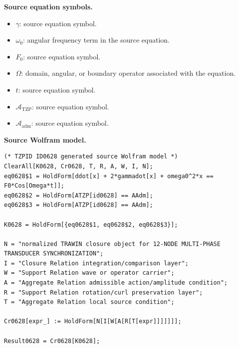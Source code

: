 \begin{minipage}[t]{0.49\linewidth}
\begingroup
\small
\raggedright
\textbf{Source equation symbols.}\par
\begin{itemize}[leftmargin=1.35em,itemsep=1pt,topsep=1pt,parsep=0pt]
    \item $\gamma$: source equation symbol.
    \item $\omega_0$: angular frequency term in the source equation.
    \item $F_0$: source equation symbol.
    \item $\Omega$: domain, angular, or boundary operator associated with the equation.
    \item $t$: source equation symbol.
    \item $\mathcal{A}_{\mathrm{TZP}}$: source equation symbol.
    \item $\mathcal{A}_{\mathrm{adm}}$: source equation symbol.
\end{itemize}
\endgroup
\end{minipage}\hfill
\begin{minipage}[t]{0.47\linewidth}
\begingroup
\scriptsize
\raggedright
\textbf{Source Wolfram model.}\par
\begin{Verbatim}[fontsize=\tiny,breaklines=true,breakanywhere=true]
(* TZPID ID0628 generated source Wolfram model *)
ClearAll[K0628, Cr0628, T, R, A, W, I, N];
eq0628$1 = HoldForm[ddot[x] + 2*gammadot[x] + omega0^2*x == F0*Cos[Omega*t]];
eq0628$2 = HoldForm[ATZP[id0628] == AAdm];
eq0628$3 = HoldForm[ATZP[id0628] == AAdm];

K0628 = HoldForm[{eq0628$1, eq0628$2, eq0628$3}];

N = "normalized TRAWIN closure object for 12-NODE MULTI-PHASE TRANSDUCER SYNCHRONIZATION";
I = "Closure Relation integration/comparison layer";
W = "Support Relation wave or operator carrier";
A = "Aggregate Relation admissible action/amplitude condition";
R = "Support Relation rotation/curl preservation layer";
T = "Aggregate Relation local source condition";

Cr0628[expr_] := HoldForm[N[I[W[A[R[T[expr]]]]]]];

Result0628 = Cr0628[K0628];
\end{Verbatim}
\endgroup
\end{minipage}


